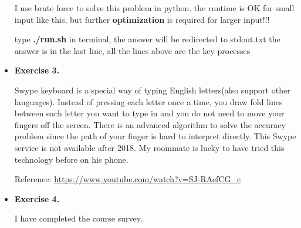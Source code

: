\documentclass{article}
\begin{document}
\begin{itemize}
I use brute force to solve this problem in python. the runtime is OK for small input like this, but further \textbf{optimization} is required for larger input!!!

type \textbf{./run.sh} in terminal, the answer will be redirected to stdout.txt
the answer is in the last line, all the lines above are the key processes

\item \textbf{Exercise 3.}

Swype keyboard is a special way of typing English letters(also support other languages). Instead of pressing each letter once a time, you draw fold lines between each letter you want to type in and you do not need to move your fingers off the screen. There is an advanced algorithm to solve the accuracy problem since the path of your finger is hard to interpret directly. This Swype service is not available after 2018. My roommate is lucky to have tried this technology before on his phone.

Reference: \url{https://www.youtube.com/watch?v=SJ-RAefCG_c}

\item \textbf{Exercise 4.}

I have completed the course survey. 

\end{itemize}

\end{document}
